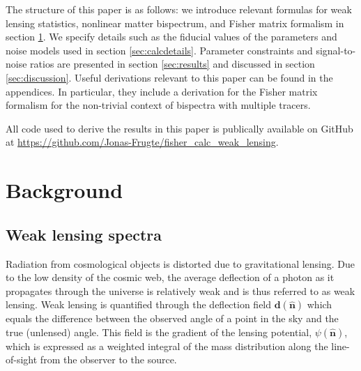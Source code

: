\documentclass[11pt]{article} %
\begin{document}
 

The structure of this paper is as follows: we introduce relevant formulas for weak lensing statistics, nonlinear matter bispectrum, and Fisher matrix formalism in section \ref{sec:theory}. We specify details such as the fiducial values of the parameters and noise models used in section \ref{sec:calcdetails}. Parameter constraints and signal-to-noise ratios are presented in section \ref{sec:results} and discussed in section \ref{sec:discussion}. Useful derivations relevant to this paper can be found in the appendices. In particular, they include a derivation for the Fisher matrix formalism for the non-trivial context of bispectra with multiple tracers.

All code used to derive the results in this paper is publically available on GitHub at \url{https://github.com/Jonas-Frugte/fisher_calc_weak_lensing}.



%     

\section{Background}
\label{sec:theory}
\subsection{Weak lensing spectra}
Radiation from cosmological objects is distorted due to gravitational lensing. Due to the low density of the cosmic web, the average deflection of a photon as it propagates through the universe is relatively weak and is thus referred to as weak lensing. Weak lensing is quantified through the deflection field $\mathbf d(\hat {\mathbf n})$ which equals the difference between the observed angle of a point in the sky and the true (unlensed) angle. This field is the gradient of the lensing potential, $\psi(\hat {\mathbf n})$, which is expressed as a weighted integral of the mass distribution along the line-of-sight from the observer to the source.
\end{document}
